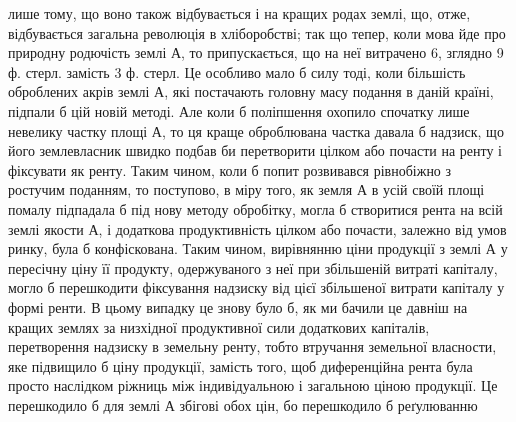 лише тому, що воно також відбувається і на кращих родах землі, що, отже,
відбувається загальна революція в хліборобстві; так що тепер, коли мова йде
про природну родючість землі А, то припускається, що на неї витрачено 6, зглядно
9 ф. стерл. замість 3 ф. стерл. Це особливо мало б силу тоді, коли більшість
оброблених акрів землі А, які постачають головну масу подання в даній країні,
підпали б цій новій методі. Але коли б поліпшення охопило спочатку лише
невелику частку площі А, то ця краще оброблювана частка давала б надзиск,
що його землевласник швидко подбав би перетворити цілком або почасти
на ренту і фіксувати як ренту. Таким чином, коли б попит розвивався рівнобіжно
з ростучим поданням, то поступово, в міру того, як земля А в усій своїй площі
помалу підпадала б під нову методу обробітку, могла б створитися рента
на всій землі якости А, і додаткова продуктивність цілком або почасти, залежно
від умов ринку, була б конфіскована. Таким чином, вирівнянню ціни продукції
з землі А у пересічну ціну її продукту, одержуваного з неї при збільшеній витраті
капіталу, могло б перешкодити фіксування надзиску від цієї збільшеної витрати
капіталу у формі ренти. В цьому випадку це знову було б, як ми бачили це
давніш на кращих землях за низхідної продуктивної сили додаткових капіталів,
перетворення надзиску в земельну ренту, тобто втручання земельної власности,
яке підвищило б ціну продукції, замість того, щоб диференційна рента була
просто наслідком ріжниць між індивідуальною і загальною ціною продукції. Це
перешкодило б для землі А збігові обох цін, бо перешкодило б реґулюванню
\parbreak{}  %
